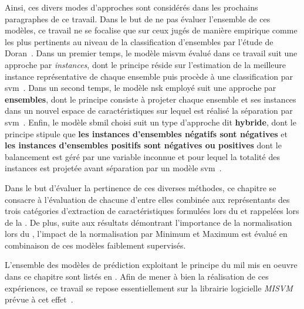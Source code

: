 Ainsi, ces divers modes d'approches sont considérés dans les prochains paragraphes de ce travail. Dans le but de ne pas évaluer l'ensemble de ces modèles, ce travail ne se focalise que sur ceux jugés de manière empirique comme les plus pertinents au niveau de la classification d'ensembles par l'étude de Doran~. Dans un premier temps, le modèle \gls{misvm} évalué dans ce travail suit une approche par \textit{instances}, dont le principe réside sur l'estimation de la meilleure instance représentative de chaque ensemble puis procède à une classification par \gls{svm}~\cite{Andrews2003}. Dans un second temps, le modèle \gls{nsk} employé suit une approche par \textbf{ensembles}, dont le principe consiste à projeter chaque ensemble et ses instances dans un nouvel espace de caractéristiques sur lequel est réalisé la séparation par \gls{svm}~\cite{Gartner2002}. Enfin, le modèle \gls{sbmil} choisi suit un type d'approche dit \textbf{hybride}, dont le principe stipule que \textbf{les instances d'ensembles négatifs sont négatives} et \textbf{les instances d'ensembles positifs sont négatives ou positives} dont le balancement est géré par une variable inconnue et pour lequel la totalité des instances est projetée avant séparation par un modèle \gls{svm}~\cite{Bunescu2007}.\par

Dans le but d'évaluer la pertinence de ces diverses méthodes, ce chapitre se consacre à l'évaluation de chacune d'entre elles combinée aux représentants des trois catégories d'extraction de caractéristiques formulées lors du  et rappelées lors de la . De plus, suite aux résultats démontrant l'importance de la normalisation lors du , l'impact de la normalisation par Minimum et Maximum est évalué en combinaison de ces modèles faiblement supervisés.\par

L'ensemble des modèles de prédiction exploitant le principe du \gls{mil} mis en oeuvre dans ce chapitre sont listés en . Afin de mener à bien la réalisation de ces expériences, ce travail se repose essentiellement sur la librairie logicielle \textit{MISVM} prévue à cet effet~\cite{Doran2013}.\par

